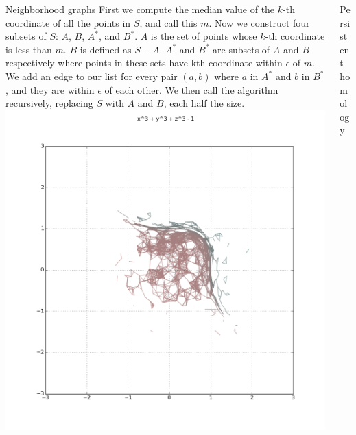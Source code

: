\documentclass{beamer}
\begin{document}
\begin{frame}{}
\begin{columns}[t]
\begin{column}{0.32\linewidth}
\begin{block}{Neighborhood graphs}
\justify
First we compute the median value of the $k$-th coordinate of all the points in $S$, and call this $m$. Now we construct four subsets of $S$: $A$, $B$, $A^*$, and $B^*$. $A$ is the set of points whose $k$-th coordinate is less than $m$. $B$ is defined as $S-A$. $A^*$ and $B^*$ are subsets of $A$ and $B$ respectively where points in these sets have kth coordinate within $\epsilon$ of $m$. We add an edge to our list for every pair $(a,b)$ where $a$ in $A^*$ and $b$ in $B^*$, and they are within $\epsilon$ of each other. We then call the algorithm recursively, replacing $S$ with $A$ and $B$, each half the size.
\\
\centering
\includegraphics[width=1\columnwidth]{plot2d_ng_7}
\end{block}

\end{column}%

\begin{column}{0.32\linewidth}

\begin{block}{Persistent homology}

\end{block}


\end{column}
\end{columns}
\end{frame}
\end{document}
